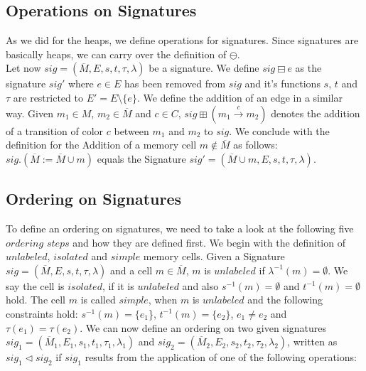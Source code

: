 \subsection{Operations on Signatures}
As we did for the heaps, we define operations for signatures. Since signatures are basically heaps, we
can carry over the definition of $\ominus$.\\
Let now $sig = (\overline{M}, E, s, t, \tau, \lambda)$ be a signature. 
We define $sig \boxminus e$ as the signature $sig'$ where $e \in E$ has been removed from $sig$ and it's functions 
$s$, $t$ and $\tau$ are restricted to $E' = E\setminus\{e\}$. We define the addition of an edge in a similar way.
Given $m_1 \in M$, $m_2 \in \overline{M}$ and $c \in C$, $sig \boxplus (m_1 \xrightarrow{c} m_2)$ denotes the addition
of a transition of color $c$ between $m_1$ and $m_2$ to $sig$. We conclude with the definition for the Addition of
a memory cell $m \not\in \overline{M}$ as follows: $sig.(\overline{M} := \overline{M} \cup {m})$ equals the Signature
$sig' = (\overline{M} \cup {m}, E, s, t, \tau, \lambda)$.

\subsection{Ordering on Signatures}

To define an ordering on signatures, we need to take a look at the following five $ordering$ $steps$ and how they are defined first.
We begin with the definition of $unlabeled$, $isolated$ and $simple$ memory cells.
Given a Signature $sig = (\overline{M}, E, s, t, \tau, \lambda)$ and a cell $m \in \overline{M}$, $m$ is $unlabeled$ if 
$\lambda^{-1}(m) = \emptyset$. We say the cell is $isolated$, if it is $unlabeled$ and also $s^{-1}(m) = \emptyset$ and 
$t^{-1}(m) = \emptyset$ hold. The cell $m$ is called $simple$, when $m$ is $unlabeled$ and the following constraints
hold: $s^{-1}(m) = \{e_1$\}, $t^{-1}(m) = \{e_2\}$, $e_1 \not= e_2$ and $\tau(e_1) = \tau(e_2)$. 
We can now define an ordering on two given signatures $sig_1 = (\overline{M}_1, E_1, s_1, t_1, \tau_1, \lambda_1)$ and
$sig_2 = (\overline{M}_2, E_2, s_2, t_2, \tau_2, \lambda_2)$, written as $sig_1 \vartriangleleft sig_2$ if $sig_1$ results
from the application of one of the following operations:

